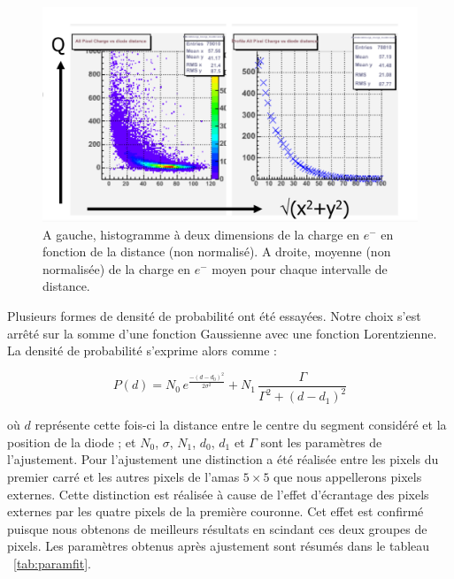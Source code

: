    
   \begin{figure}[!htb]
    \begin{center} 
     \includegraphics[scale=0.35]{./figures/plot_2D_charge_pdf.png}
     \caption{A gauche, histogramme \`a deux dimensions de la charge en $e^-$ en fonction de la distance (non normalis\'e). A droite, moyenne (non normalis\'ee) de la charge en $e^-$ moyen pour chaque intervalle de distance. }
     \label{fig:plotcharge}
     \end{center}
   \end{figure}

   Plusieurs formes de densit\'e de probabilit\'e ont \'et\'e essay\'ees. Notre choix s'est arr\^eté sur la somme d'une fonction Gaussienne avec une fonction Lorentzienne. La densit\'e de probabilit\'e s'exprime alors comme :
 
   \[ P(d) = N_0 \, e^{\frac{-(d-d_0)^2}{2\sigma^2}} + N_1 \, \frac{\Gamma}{\Gamma^2 + (d-d_1)^2} \]
   
   o\`u $d$ repr\'esente cette fois-ci la distance entre le centre du segment consid\'er\'e et la position de la diode ; et $N_0$, $\sigma$, $N_1$, $d_0$, $d_1$ et $\Gamma$ sont les param\`etres de l'ajustement. Pour l'ajustement une distinction a \'et\'e r\'ealis\'ee entre les pixels du premier carr\'e et les autres pixels de l'amas $5 \times 5$ que nous appellerons pixels externes. Cette distinction est r\'ealis\'ee \`a cause de l'effet d'\'ecrantage des pixels externes par les quatre pixels de la premi\`ere couronne. Cet effet est confirm\'e puisque nous obtenons de meilleurs r\'esultats en scindant ces deux groupes de pixels. Les param\`etres obtenus apr\`es ajustement sont r\'esum\'es dans le tableau ~\ref{tab:paramfit}.
   
